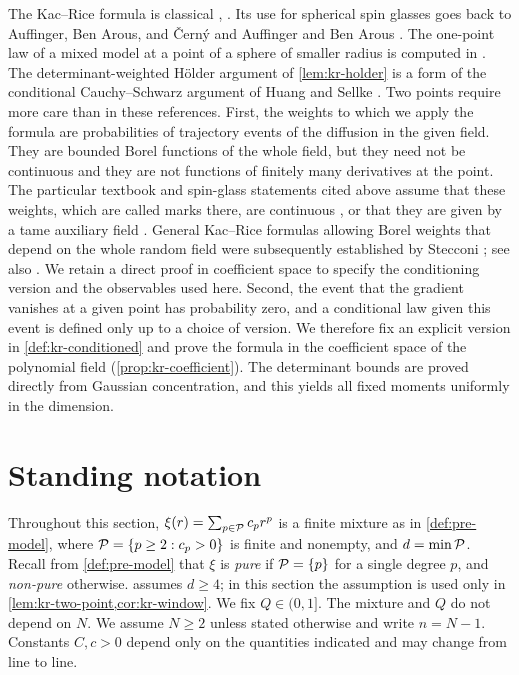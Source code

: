 The Kac--Rice formula is classical \cite[Theorems~11.2.1 and~12.1.1]{AdlerTaylor2007}, \cite[Theorems~6.2 and~6.4]{AzaisWschebor2009}.
Its use for spherical spin glasses goes back to Auffinger, Ben Arous, and \v{C}ern\'y \cite{AuffingerBenArousCerny2013} and Auffinger and Ben Arous \cite{AuffingerBenArous2013}. The one-point law of a mixed model at a point of a sphere of smaller radius is computed in \cite[Section~4.1]{BenArousSubagZeitouni2020}. The determinant-weighted H\"older argument of \cref{lem:kr-holder} is a form of the conditional Cauchy--Schwarz argument of Huang and Sellke \cite[Corollary~3.16]{HuangSellke2024}.
Two points require more care than in these references. First, the weights to which we apply the formula are probabilities of trajectory events of the diffusion in the given field. They are bounded Borel functions of the whole field, but they need not be continuous and they are not functions of finitely many derivatives at the point. The particular textbook and spin-glass statements cited above assume that these weights, which are called marks there, are continuous \cite[Theorem~6.4]{AzaisWschebor2009}, or that they are given by a tame auxiliary field \cite[Lemma~36]{Subag2017geometry}. General Kac--Rice formulas allowing Borel weights that depend on the whole random field were subsequently established by Stecconi \cite[Theorem~29]{Stecconi2022}; see also \cite[Proposition~6.1]{MathisStecconi2024}. We retain a direct proof in coefficient space to specify the conditioning version and the observables used here. Second, the event that the gradient vanishes at a given point has probability zero, and a conditional law given this event is defined only up to a choice of version. We therefore fix an explicit version in \cref{def:kr-conditioned} and prove the formula in the coefficient space of the polynomial field (\cref{prop:kr-coefficient}). The determinant bounds are proved directly from Gaussian concentration, and this yields all fixed moments uniformly in the dimension.

\section{Standing notation}\label{sec:kr-notation}

Throughout this section, $\xi(r)=\sum_{p\in\mathcal P}c_pr^p$ is a finite mixture as in \cref{def:pre-model}, where $\mathcal P=\{p\ge2:c_p>0\}$ is finite and nonempty, and $d=\min\mathcal P$. Recall from \cref{def:pre-model} that $\xi$ is \emph{pure} if $\mathcal P=\{p\}$ for a single degree $p$, and \emph{non-pure} otherwise.  assumes $d\ge4$; in this section the assumption is used only in \cref{lem:kr-two-point,cor:kr-window}. We fix $Q\in(0,1]$. The mixture and $Q$ do not depend on $N$. We assume $N\ge2$ unless stated otherwise and write $n=N-1$. Constants $C,c>0$ depend only on the quantities indicated and may change from line to line.

